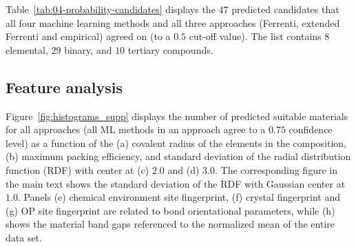\documentclass[superscriptaddress,unsortedaddress,
 amsmath,amssymb,
 aps,
]{revtex4-2}
\begin{document}
Table~\ref{tab:04-probability-candidates} displays the $47$ predicted candidates that all four machine learning methods and all three approaches (Ferrenti, extended Ferrenti and empirical) agreed on (to a $0.5$ cut-off value).    
The list contains $8$ elemental, $29$ binary, and $10$ tertiary compounds.



\subsection*{Feature analysis}

\begin{figure}[ht!]
\begin{subfigure}[t]{1\textwidth}
    
\end{subfigure}
\begin{subfigure}[b]{0.45\textwidth}
    \scalebox{0.85}{}
    \subcaption{}
\end{subfigure}
\begin{subfigure}[b]{0.45\textwidth}
    \scalebox{0.85}{}
    \subcaption{}
\end{subfigure}%

\begin{subfigure}[b]{0.45\textwidth}
    \scalebox{0.85}{}
    \subcaption{}
\end{subfigure}
\begin{subfigure}[b]{0.45\textwidth}
    \scalebox{0.85}{}
    \subcaption{}
\end{subfigure}%
\end{figure}

Figure~\ref{fig:histograms_supp} displays the number of predicted suitable materials for all approaches (all ML methods in an approach agree to a $0.75$ confidence level) as a function of the (a) covalent radius of the elements in the composition, (b) maximum packing efficiency, and standard deviation of the radial distribution function (RDF) with center at (c) $2.0$ and (d) $3.0$. The corresponding figure in the main text shows the standard deviation of the RDF with Gaussian center at $1.0$. 
Panels (e) chemical environment site fingerprint, (f) crystal fingerprint and (g) OP site fingerprint are related to bond orientational parameters, while (h) shows the material band gaps referenced to the normalized mean of the entire data set.  
\end{document}
